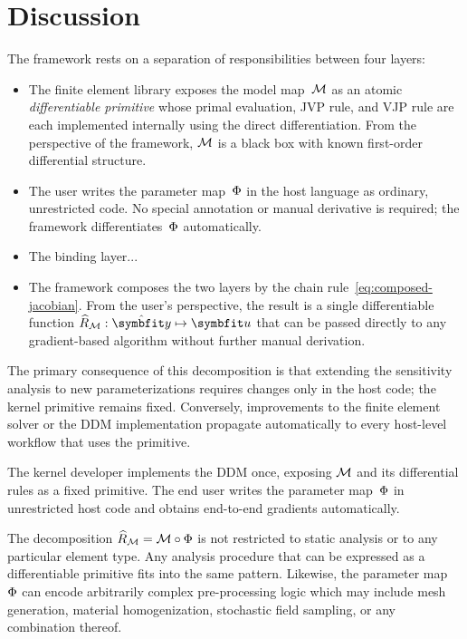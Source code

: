 
\section{Discussion}
\label{sec:discussion}

The framework rests on a separation of responsibilities between
four layers:
\begin{itemize}
\item 
The finite element library exposes the model map~$\mathcal{M}$ as an atomic \emph{differentiable primitive} whose primal evaluation, JVP rule, and VJP rule are each implemented internally using the direct differentiation.  
From the perspective of the \autodiff{} framework, $\mathcal{M}$ is
a black box with known first-order differential structure. 

\item
The user writes the parameter map~$\Phi$ in the host language as
ordinary, unrestricted code.  
No special annotation or manual
derivative is required; the \autodiff{} framework differentiates~$\Phi$
automatically.

\item The binding layer...

\item
The \autodiff{} framework composes the two layers by the chain
rule~\eqref{eq:composed-jacobian}.  
From the user's perspective, the result
is a single differentiable function
$\Tmap : \haty \mapsto \ModelState$ that can be passed directly to any
gradient-based algorithm without further manual derivation.
\end{itemize}


The primary consequence of this decomposition is that extending the
sensitivity analysis to new parameterizations requires changes only in
the host code; the kernel primitive remains fixed.  
Conversely, improvements to the finite element solver or the DDM implementation
propagate automatically to every host-level workflow that uses the primitive.


The kernel developer implements the DDM once, exposing $\mathcal{M}$ and its
differential rules as a fixed primitive.  
The end user writes the parameter map~$\Phi$ in unrestricted host code and obtains end-to-end gradients automatically.  


The decomposition $\widehat{R}_{\mathcal M} = \mathcal{M} \circ \Phi$ is not restricted to
static analysis or to any particular element type. 
Any analysis procedure that can be expressed as a differentiable primitive fits into the same pattern.  
Likewise, the parameter
map~$\Phi$ can encode arbitrarily complex pre-processing logic which may include 
mesh generation, material homogenization, stochastic field sampling,
or any combination thereof.
